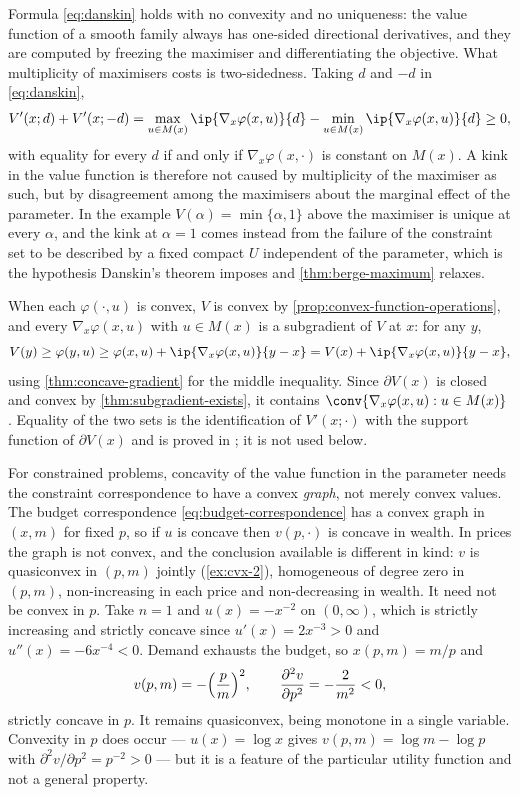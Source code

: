 \begin{remark}\label{rem:danskin-reading}
	Formula \eqref{eq:danskin} holds with no convexity and no uniqueness: the value
	function of a smooth family always has one-sided directional derivatives, and
	they are computed by freezing the maximiser and differentiating the objective.
	What multiplicity of maximisers costs is two-sidedness. Taking $d$ and $-d$ in
	\eqref{eq:danskin},
	\[
		V'(x;d)+V'(x;-d)=\max_{u\in M(x)}\ip{\nabla_{x}\varphi(x,u)}{d}
		-\min_{u\in M(x)}\ip{\nabla_{x}\varphi(x,u)}{d}\geq0,
	\]
	with equality for every $d$ if and only if $\nabla_{x}\varphi(x,\cdot)$ is
	constant on $M(x)$. A kink in the value function is therefore not caused by
	multiplicity of the maximiser as such, but by disagreement among the maximisers
	about the marginal effect of the parameter. In the example $V(\alpha)=\min\{\alpha,1\}$
	above the maximiser is unique at every $\alpha$, and the kink at $\alpha=1$ comes
	instead from the failure of the constraint set to be described by a fixed compact
	$U$ independent of the parameter, which is the hypothesis Danskin's theorem
	imposes and \autoref{thm:berge-maximum} relaxes.

	When each $\varphi(\cdot,u)$ is convex, $V$ is convex by
	\autoref{prop:convex-function-operations}, and every
	$\nabla_{x}\varphi(x,u)$ with $u\in M(x)$ is a subgradient of $V$ at $x$: for
	any $y$,
	\[
		V(y)\geq\varphi(y,u)\geq\varphi(x,u)+\ip{\nabla_{x}\varphi(x,u)}{y-x}
		=V(x)+\ip{\nabla_{x}\varphi(x,u)}{y-x},
	\]
	using \autoref{thm:concave-gradient} for the middle inequality. Since
	$\partial V(x)$ is closed and convex by \autoref{thm:subgradient-exists}, it
	contains $\conv\{\nabla_{x}\varphi(x,u) : u\in M(x)\}$. Equality of the two sets
	is the identification of $V'(x;\cdot)$ with the support function of
	$\partial V(x)$ and is proved in
	\textcite[Sec.~23]{rockafellar1970convex}; it is not used below.
\end{remark}

For constrained problems, concavity of the value function in the parameter needs
the constraint correspondence to have a convex \emph{graph}, not merely convex
values. The budget correspondence \eqref{eq:budget-correspondence} has a convex
graph in $(x,m)$ for fixed $p$, so if $u$ is concave then $v(p,\cdot)$ is concave
in wealth. In prices the graph is not convex, and the conclusion available is
different in kind: $v$ is quasiconvex in $(p,m)$ jointly (\autoref{ex:cvx-2}),
homogeneous of degree zero in $(p,m)$, non-increasing in each price and
non-decreasing in wealth. It need not be convex in $p$. Take $n=1$ and
$u(x)=-x^{-2}$ on $(0,\infty)$, which is strictly increasing and strictly
concave since $u'(x)=2x^{-3}>0$ and $u''(x)=-6x^{-4}<0$. Demand exhausts the
budget, so $x(p,m)=m/p$ and
\[
	v(p,m)=-\Bigl(\frac{p}{m}\Bigr)^{2},
	\qquad
	\frac{\partial^{2}v}{\partial p^{2}}=-\frac{2}{m^{2}}<0,
\]
strictly concave in $p$. It remains quasiconvex, being monotone in a single
variable. Convexity in $p$ does occur --- $u(x)=\log x$ gives
$v(p,m)=\log m-\log p$ with $\partial^{2}v/\partial p^{2}=p^{-2}>0$ --- but it
is a feature of the particular utility function and not a general property.


